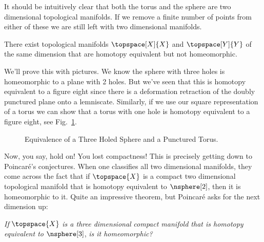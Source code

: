 \documentclass{book}                                                           %
\begin{document}
                It should be intuitively clear that both the torus and the
                sphere are two dimensional topological manifolds. If we remove a
                finite number of points from either of these we are still left
                with two dimensional manifolds.
                \begin{theorem}
                    There exist topological manifolds $\topspace[X]{X}$ and
                    $\topspace[Y]{Y}$ of the same dimension that are homotopy
                    equivalent but not homeomorphic.
                \end{theorem}
                We'll prove this with pictures. We know the sphere with three
                holes is homeomorphic to a plane with 2 holes. But we've seen
                that this is homotopy equivalent to a figure eight since there
                is a deformation retraction of the doubly punctured plane onto
                a lemniscate. Similarly, if we use our square representation of
                a torus we can show that a torus with one hole is homotopy
                equivalent to a figure eight, see
                Fig.~\ref{fig:HE_Torus_Sphere_Fig_8}.
                \begin{figure}
                        \centering
                        \captionsetup{type=figure}
                        \resizebox{\textwidth}{!}{%
                        }
                        \caption{Equivalence of a Three Holed Sphere
                                 and a Punctured Torus.}
                        \label{fig:HE_Torus_Sphere_Fig_8}
                \end{figure}
                Now, you say, hold on! You lost compactness! This is precisely
                getting down to Poincar\'{e}'s conjectures. When one classifies
                all two dimensional manifolds, they come across the fact that
                if $\topspace{X}$ is a compact two dimensional topological
                manifold that is homotopy equivalent to $\nsphere[2]$, then it
                is homeomorphic to it. Quite an impressive theorem, but
                Poincar\'{e} asks for the next dimension up:
                \begin{center}
                    \textit{If} $\topspace{X}$ \textit{is a three dimensional}
                    \textit{compact manifold that is homotopy equivalent to}
                    $\nsphere[3]$, \textit{is it homeomorphic?}
                \end{center}
\end{document}
